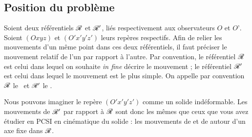 \documentclass[12pt,fancy]{cours}
\begin{document}

\subsection{Position du problème}

Soient deux référentiels $\mathcal{R}$ et $\mathcal{R}'$, liés respectivement aux observateurs $O$ et $O’$. Soient $(Oxyz)$ et $(O'x'y'z')$ leurs repères respectifs. Afin de relier les mouvements
d’un même point dans ces deux référentiels, il faut préciser le mouvement relatif de l’un par rapport à l’autre. Par convention, le référentiel $\mathcal{R}$ est celui dans lequel on souhaite \emph{in fine} décrire le mouvement ; le référentiel $\mathcal{R}'$ est celui dans lequel le mouvement est le plus simple.
On appelle par convention $\mathcal{R}$ le \imp{\nomR}~et $\mathcal{R}'$ le \imp{\nomRprime}.

 Nous pouvons imaginer le repère $(O'x'y'z')$ comme un solide indéformable. Les mouvements de $\mathcal{R}'$ par rapport à $\mathcal{R}$ sont donc les mêmes que ceux que vous avez étudier en PCSI en cinématique du solide : les mouvements de  et de  autour d'un axe fixe dans $\mathcal{R}$.
\end{document}
